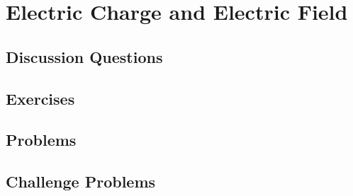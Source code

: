 
\chapter{Electric Charge and Electric Field}

\section{Discussion Questions}

\section{Exercises}

\section{Problems}

\section{Challenge Problems}